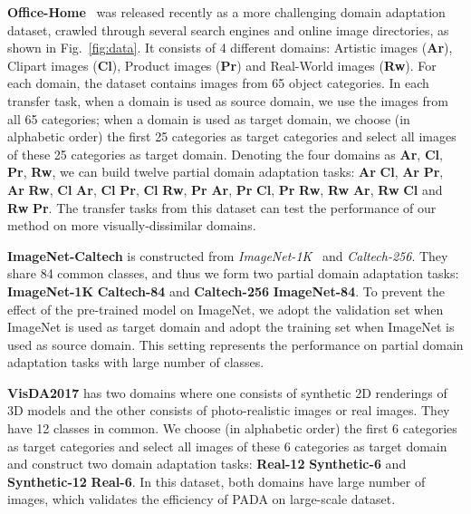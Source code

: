 \documentclass[runningheads]{llncs}
\begin{document}
\textbf{Office-Home}~\cite{cite:CVPR17OfficeHome} was released recently as a more challenging domain adaptation dataset, crawled through several search engines and online image directories, as shown in Fig.~\ref{fig:data}. It consists of 4 different domains: Artistic images (\textbf{Ar}), Clipart images (\textbf{Cl}), Product images (\textbf{Pr}) and Real-World images (\textbf{Rw}). For each domain, the dataset contains images from 65 object categories. In each transfer task, when a domain is used as source domain, we use the images from all 65 categories; when a domain is used as target domain, we choose (in alphabetic order) the first 25 categories as target categories and select all images of these 25 categories as target domain. Denoting the four domains as \textbf{Ar}, \textbf{Cl}, \textbf{Pr}, \textbf{Rw}, we can build twelve partial domain adaptation tasks: \textbf{Ar}  \textbf{Cl}, \textbf{Ar}  \textbf{Pr}, \textbf{Ar}  \textbf{Rw}, \textbf{Cl}  \textbf{Ar}, \textbf{Cl}  \textbf{Pr}, \textbf{Cl}  \textbf{Rw}, \textbf{Pr}  \textbf{Ar}, \textbf{Pr}  \textbf{Cl}, \textbf{Pr}  \textbf{Rw}, \textbf{Rw}  \textbf{Ar}, \textbf{Rw}  \textbf{Cl} and \textbf{Rw}  \textbf{Pr}. The transfer tasks from this dataset can test the performance of our method on more visually-dissimilar domains. 

\textbf{ImageNet-Caltech} is constructed from \textit{ImageNet-1K}~\cite{cite:ILSVRC15} and \textit{Caltech-256}. They share 84 common classes, and thus we form two partial domain adaptation tasks: \textbf{ImageNet-1K}  \textbf{Caltech-84} and \textbf{Caltech-256}  \textbf{ImageNet-84}. To prevent the effect of the pre-trained model on ImageNet, we adopt the validation set when ImageNet is used as target domain and adopt the training set when ImageNet is used as source domain. This setting represents the performance on partial domain adaptation tasks with large number of classes.

\textbf{VisDA2017} has two domains where one consists of synthetic 2D renderings of 3D models and the other consists of photo-realistic images or real images. They have 12 classes in common. We choose (in alphabetic order) the first 6 categories as target categories and select all images of these 6 categories as target domain and construct two domain adaptation tasks: \textbf{Real-12}  \textbf{Synthetic-6} and \textbf{Synthetic-12}  \textbf{Real-6}. In this dataset, both domains have large number of images, which validates the efficiency of PADA on large-scale dataset.
\end{document}
